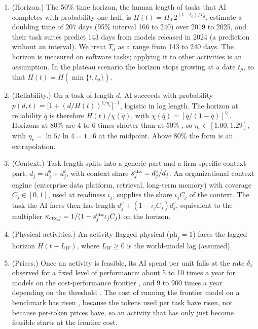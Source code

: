\begin{assumption}\label{ass:ext-capability}
\begin{enumerate}
\item[(i)] (Horizon.) The 50\% time horizon, the human length of tasks that AI completes with probability one half, is $H(t)=H_0\,2^{(t-t_0)/T_d}$. \citet{kwa2025measuring} estimate a doubling time of 207 days (95\% interval 166 to 240) over 2019 to 2025, and their task suites predict 143 days from models released in 2024 (a prediction without an interval). We treat $T_d$ as a range from 143 to 240 days. The horizon is measured on software tasks; applying it to other activities is an assumption. In the plateau scenario the horizon stops growing at a date $t_p$, so that $H(t)=H(\min\{t,t_p\})$.
\item[(ii)] (Reliability.) On a task of length $d$, AI succeeds with probability $p(d,t)=\bigl[1+(d/H(t))^{1/\eta_r}\bigr]^{-1}$, logistic in log length. The horizon at reliability $\bar q$ is therefore $H(t)/\chi(\bar q)$, with $\chi(\bar q)=[\bar q/(1-\bar q)]^{\eta_r}$. Horizons at 80\% are 4 to 6 times shorter than at 50\% \citep{kwa2025measuring}, so $\eta_r\in[1.00,1.29]$, with $\eta_r=\ln5/\ln4=1.16$ at the midpoint. Above 80\% the form is an extrapolation.
\item[(iii)] (Context.) Task length splits into a generic part and a firm-specific context part, $d_j=d^g_j+d^c_j$, with context share $s^{\rm ctx}_j=d^c_j/d_j$. An organizational context engine (enterprise data platform, retrieval, long-term memory) with coverage $C_j\in[0,1]$, used at readiness $\iota_j$, supplies the share $\iota_jC_j$ of the context. The task the AI faces then has length $d^g_j+(1-\iota_jC_j)d^c_j$, equivalent to the multiplier $\kappa_{{\rm ctx},j}=1/(1-s^{\rm ctx}_j\iota_jC_j)$ on the horizon.
\item[(iv)] (Physical activities.) An activity flagged physical ($\mathrm{ph}_j=1$) faces the lagged horizon $H(t-L_W)$, where $L_W\ge0$ is the world-model lag (assumed).
\item[(v)] (Prices.) Once an activity is feasible, its AI spend per unit falls at the rate $\delta_\pi$ observed for a fixed level of performance: about 5 to 10 times a year for models on the cost-performance frontier \citep{gundlach2025price}, and 9 to 900 times a year depending on the threshold \citep{epoch2025inference}. The cost of running the frontier model on a benchmark has risen \citep{gundlach2025price}, because the tokens used per task have risen, not because per-token prices have, so an activity that has only just become feasible starts at the frontier cost.

\end{enumerate}
\end{assumption}
